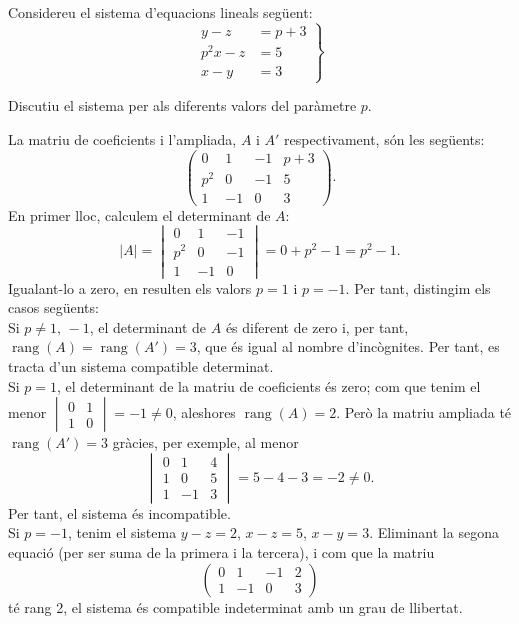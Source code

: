 Considereu el sistema d'equacions lineals següent:
\[
\left.\begin{aligned}
y-z&=p+3\\
p^2x-z&=5\\
x-y&=3
\end{aligned}\right\}
\]

\begin{apartats}

Discutiu el sistema per als diferents valors del paràmetre $p$.

\begin{solucio}
La matriu de coeficients i l'ampliada, $A$ i $A'$ respectivament, són les següents:
\[
\left(\begin{array}{ccc|c}0&1&-1&p+3\\p^2&0&-1&5\\1&-1&0&3\end{array}\right).
\]
En primer lloc, calculem el determinant de $A$:
\[
|A|=\begin{vmatrix}0&1&-1\\p^2&0&-1\\1&-1&0\end{vmatrix}=0+p^2-1=p^2-1 .
\]
Igualant-lo a zero, en resulten els valors $p=1$ i $p=-1$. Per tant, distingim els casos següents:\\
Si $p\neq1,\,-1$, el determinant de $A$ és diferent de zero i, per tant, $\operatorname{rang}(A)=\operatorname{rang}(A')=3$,
que és igual al nombre d'incògnites. Per tant, es tracta d'un sistema compatible determinat.\\
Si $p=1$, el determinant de la matriu de coeficients és zero; com que tenim el menor
$\begin{vmatrix}0&1\\1&0\end{vmatrix}=-1\neq0$, aleshores $\operatorname{rang}(A)=2$. Però la matriu ampliada té
$\operatorname{rang}(A')=3$ gràcies, per exemple, al menor
\[
\begin{vmatrix}0&1&4\\1&0&5\\1&-1&3\end{vmatrix}=5-4-3=-2\neq0 .
\]
Per tant, el sistema és incompatible.\\
Si $p=-1$, tenim el sistema $y-z=2$, $x-z=5$, $x-y=3$. Eliminant la segona equació (per ser suma de la
primera i la tercera), i com que la matriu
\[
\begin{pmatrix}0&1&-1&2\\1&-1&0&3\end{pmatrix}
\]
té rang 2, el sistema és compatible indeterminat amb un grau de llibertat.


\end{solucio}
\end{apartats}
